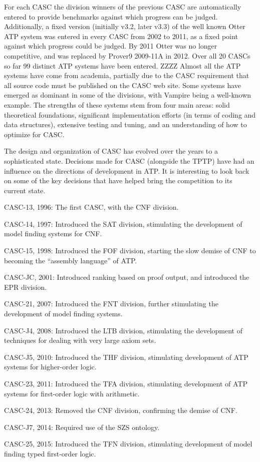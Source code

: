 \documentclass{easychair}
\newenvironment{packed_itemize}{
\vspace*{-0.2em}
\begin{itemize}
\setlength{\partopsep}{0pt}
\setlength{\itemsep}{1pt}
\setlength{\parskip}{0pt}
\setlength{\parsep}{0pt}
}{\end{itemize}}
\begin{document}
For each CASC the division winners of the previous CASC are automatically
entered to provide benchmarks against which progress can be judged.
Additionally, a fixed version (initially v3.2, later v3.3) of the well known 
Otter ATP system was entered in every CASC from 2002 to 2011, as a fixed 
point against which progress could be judged.
By 2011 Otter was no longer competitive, and was replaced by Prover9 2009-11A
in 2012.
Over all 20 CASCs so far 99 distinct ATP systems have been entered.  ZZZZ
Almost all the ATP systems have come from academia, partially due to the
CASC requirement that all source code must be published on the CASC web site.
Some systems have emerged as dominant in some of the divisions, with Vampire being a well-known
example.
The strengths of these systems stem from four main areas:
solid theoretical foundations, significant implementation efforts (in terms of coding and data 
structures), extensive testing and tuning, and an understanding of how to optimize for CASC.

The design and organization of CASC has evolved over the years to a sophisticated state.
Decisions made for CASC (alongside the TPTP) have had an influence on the directions of 
development in ATP.
It is interesting to look back on some of the key decisions that have helped 
bring the competition to its current state.
\begin{packed_itemize}
\item CASC-13, 1996: The first CASC, with the CNF division.
\item CASC-14, 1997: Introduced the SAT division, stimulating the development of model finding 
      systems for CNF.
\item CASC-15, 1998: Introduced the FOF division, starting the slow demise of CNF to becoming 
      the ``assembly language'' of ATP. 
\item CASC-JC, 2001: Introduced ranking based on proof output, and introduced the EPR division.
\item CASC-21, 2007: Introduced the FNT division, further stimulating the development of model 
      finding systems.
\item CASC-J4, 2008: Introduced the LTB division, stimulating the development of techniques for 
      dealing with very large axiom sets.
\item CASC-J5, 2010: Introduced the THF division, stimulating development of ATP systems for 
      higher-order logic.
\item CASC-23, 2011: Introduced the TFA division, stimulating development of ATP systems for 
      first-order logic with arithmetic.
\item CASC-24, 2013: Removed the CNF division, confirming the demise of CNF.
\item CASC-J7, 2014: Required use of the SZS ontology.
\item CASC-25, 2015: Introduced the TFN division, stimulating development of model finding typed 
      first-order logic.
\end{packed_itemize}
\end{document}
